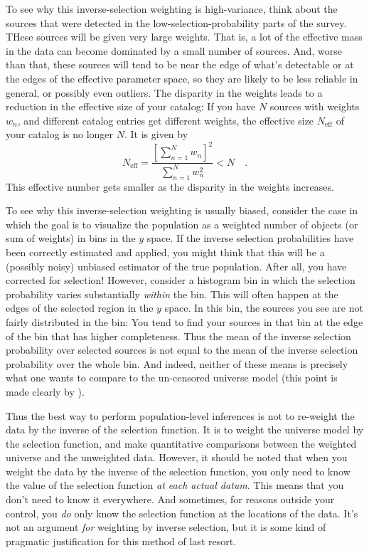 \documentclass[modern]{aastex62}
\begin{document}
To see why this inverse-selection weighting is high-variance, think about
the sources that were detected in the low-selection-probability parts of
the survey.
THese sources will be given very large weights.
That is, a lot of the effective mass in the data can become dominated by
a small number of sources.
And, worse than that, these sources will tend to be near the edge of
what's detectable or at the edges of the effective parameter space, so
they are likely to be less reliable in general, or possibly even outliers.
The disparity in the weights leads to a reduction in the effective size
of your catalog:
If you have $N$ sources with weights $w_n$, and different catalog entries get
different weights, the effective size $N_\mathrm{eff}$ of your catalog
is no longer $N$.
It is given by
\begin{equation}
N_\mathrm{eff} = \frac{\left[\sum_{n=1}^N w_n\right]^2}{\sum_{n=1}^N w_n^2} < N \quad .
\end{equation}
This effective number gets smaller as the disparity in the weights increases.

To see why this inverse-selection weighting is usually biased,
consider the case in which the goal is to visualize the population as
a weighted number of objects (or sum of weights) in bins in the $y$
space.
If the inverse selection probabilities have been correctly estimated
and applied, you might think that this will be a (possibly noisy)
unbiased estimator of the true population.
After all, you have corrected for selection!
However, consider a histogram bin in which the selection probability
varies substantially \emph{within} the bin.
This will often happen at the edges of the selected region in the $y$
space.
In this bin, the sources you see are not fairly distributed in the
bin: You tend to find your sources in that bin at the edge of the bin
that has higher completeness.
Thus the mean of the inverse selection probability over selected
sources is not equal to the mean of the inverse selection probability
over the whole bin.
And indeed, neither of these means is precisely what one wants to
compare to the un-censored universe model (this point is made clearly
by \citealt{blogpost}).

Thus the best way to perform population-level inferences is not to
re-weight the data by the inverse of the selection function.  It is to
weight the universe model by the selection function, and make
quantitative comparisons between the weighted universe and the
unweighted data.
However, it should be noted that when you weight the data by the
inverse of the selection function, you only need to know the value of
the selection function \emph{at each actual datum}.
This means that you don't need to know it everywhere.
And sometimes, for reasons outside your control, you \emph{do} only
know the selection function at the locations of the data.
It's not an argument \emph{for} weighting by inverse selection, but it
is some kind of pragmatic justification for this method of last
resort.
\end{document}
